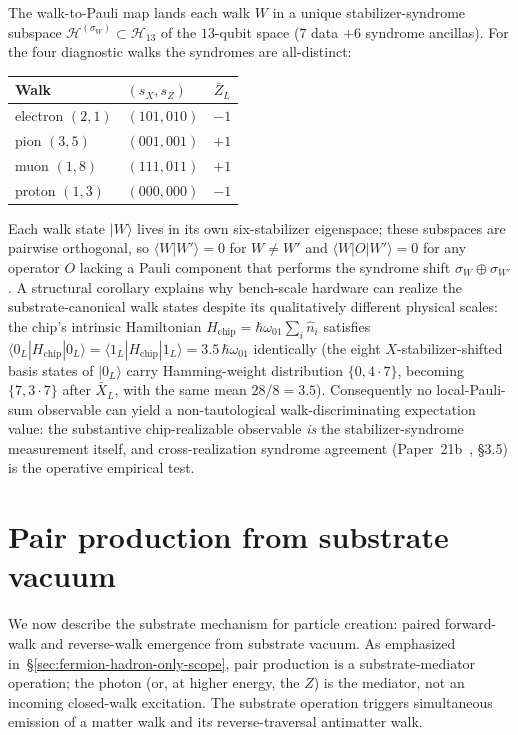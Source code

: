 \documentclass[11pt]{article}
\newcommand{\barX}{\bar X_L}
\newcommand{\barZ}{\bar Z_L}
\begin{document}
The walk-to-Pauli map lands each walk $W$ in a unique stabilizer-syndrome subspace $\mathcal{H}^{(\sigma_W)} \subset \mathcal{H}_{13}$ of the $13$-qubit space ($7$ data $+ 6$ syndrome ancillas).  For the four diagnostic walks the syndromes are all-distinct:
\begin{center}
\begin{tabular}{llc}
\toprule
Walk & $(s_X, s_Z)$ & $\barZ$ \\
\midrule
electron $(2, 1)$ & $(101, 010)$ & $-1$ \\
pion $(3, 5)$     & $(001, 001)$ & $+1$ \\
muon $(1, 8)$     & $(111, 011)$ & $+1$ \\
proton $(1, 3)$   & $(000, 000)$ & $-1$ \\
\bottomrule
\end{tabular}
\end{center}
Each walk state $|W\rangle$ lives in its own six-stabilizer eigenspace; these subspaces are pairwise orthogonal, so $\langle W | W'\rangle = 0$ for $W \neq W'$ and $\langle W | O | W'\rangle = 0$ for any operator $O$ lacking a Pauli component that performs the syndrome shift $\sigma_W \oplus \sigma_{W'}$.  A structural corollary explains why bench-scale hardware can realize the substrate-canonical walk states despite its qualitatively different physical scales: the chip's intrinsic Hamiltonian $H_\text{chip} = \hbar \omega_{01} \sum_i \hat n_i$ satisfies $\langle 0_L | H_\text{chip} | 0_L\rangle = \langle 1_L | H_\text{chip} | 1_L\rangle = 3.5\,\hbar\omega_{01}$ identically (the eight $X$-stabilizer-shifted basis states of $|0_L\rangle$ carry Hamming-weight distribution $\{0, 4{\cdot}7\}$, becoming $\{7, 3{\cdot}7\}$ after $\barX$, with the same mean $28/8 = 3.5$).  Consequently no local-Pauli-sum observable can yield a non-tautological walk-discriminating expectation value: the substantive chip-realizable observable \emph{is} the stabilizer-syndrome measurement itself, and cross-realization syndrome agreement (Paper~21b~\cite{Paper21b}, \S3.5) is the operative empirical test.

\section{Pair production from substrate vacuum}
\label{sec:pair-production}

We now describe the substrate mechanism for particle creation: paired forward-walk and reverse-walk emergence from substrate vacuum.  As emphasized in~\S\ref{sec:fermion-hadron-only-scope}, pair production is a substrate-mediator operation; the photon (or, at higher energy, the $Z$) is the mediator, not an incoming closed-walk excitation.  The substrate operation triggers simultaneous emission of a matter walk and its reverse-traversal antimatter walk.
\end{document}
